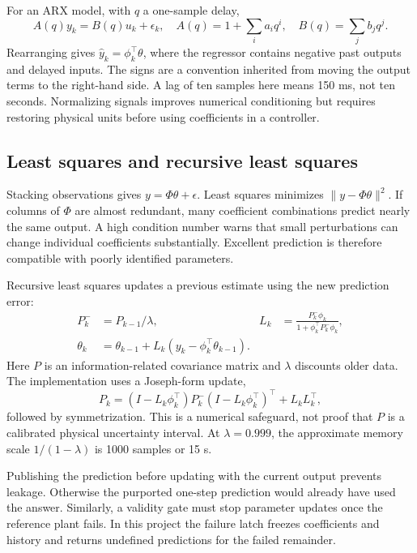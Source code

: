 For an ARX model, with $q$ a one-sample delay,
\begin{equation}A(q)y_k=B(q)u_k+\epsilon_k,\quad
A(q)=1+\sum_i a_iq^i,\quad B(q)=\sum_jb_jq^j.
\end{equation}
Rearranging gives $\hat y_k=\phi_k^\top\theta$, where the regressor contains negative past outputs and delayed inputs. The signs are a convention inherited from moving the output terms to the right-hand side. A lag of ten samples here means 150 ms, not ten seconds. Normalizing signals improves numerical conditioning but requires restoring physical units before using coefficients in a controller.

\subsection{Least squares and recursive least squares}
Stacking observations gives $y=\Phi\theta+\epsilon$. Least squares minimizes $\|y-\Phi\theta\|^2$. If columns of $\Phi$ are almost redundant, many coefficient combinations predict nearly the same output. A high condition number warns that small perturbations can change individual coefficients substantially. Excellent prediction is therefore compatible with poorly identified parameters.

Recursive least squares updates a previous estimate using the new prediction error:
\begin{align}
P_k^-&=P_{k-1}/\lambda,&
L_k&=\frac{P_k^-\phi_k}{1+\phi_k^\top P_k^-\phi_k},\\
\theta_k&=\theta_{k-1}+L_k(y_k-\phi_k^\top\theta_{k-1}).
\end{align}
Here $P$ is an information-related covariance matrix and $\lambda$ discounts older data. The implementation uses a Joseph-form update,
\begin{equation}P_k=(I-L_k\phi_k^\top)P_k^-(I-L_k\phi_k^\top)^\top+L_kL_k^\top,
\end{equation}
followed by symmetrization. This is a numerical safeguard, not proof that $P$ is a calibrated physical uncertainty interval. At $\lambda=0.999$, the approximate memory scale $1/(1-\lambda)$ is 1000 samples or 15 s.

Publishing the prediction before updating with the current output prevents leakage. Otherwise the purported one-step prediction would already have used the answer. Similarly, a validity gate must stop parameter updates once the reference plant fails. In this project the failure latch freezes coefficients and history and returns undefined predictions for the failed remainder.

